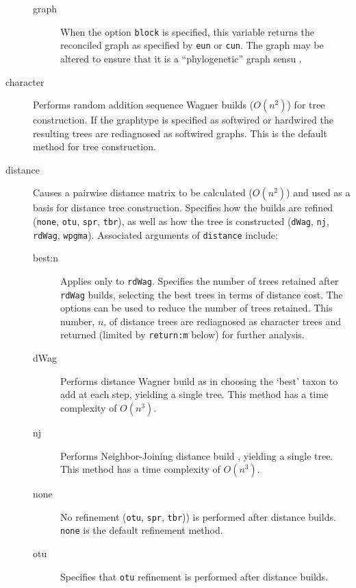 \begin{description}
\begin{description}
			\item[graph] When the option \texttt{block} is specified, this variable returns the 
			reconciled graph as specified by \texttt{eun} or \texttt{cun}. The graph may be 
			altered to ensure that it is a ``phylogenetic'' graph sensu \cite{Moretetal2005}.
		\end{description}			
		
		\item [character] Performs random addition sequence Wagner \citep{Farris1970} builds 
		($O(n^2)$) for tree construction. If the graphtype is specified as softwired or hardwired 
		the resulting trees are rediagnosed as softwired graphs. This is 
		the default method for tree construction.
		
		\item [distance] Causes a pairwise distance matrix to be calculated ($O(n^2)$) and used 
		as a basis for distance tree construction. Specifies how the builds are refined (\texttt{none}, 
		\texttt{otu}, \texttt{spr}, \texttt{tbr}), as well as how the tree is constructed (\texttt{dWag}, 
		\texttt{nj}, \texttt{rdWag}, \texttt{wpgma}). Associated arguments of \texttt{distance} include:
				
		\begin{description}
			\item[best:n] Applies only to \texttt{rdWag}. Specifies the number of trees retained 
			after 	\texttt{rdWag} builds, selecting the best trees in terms of distance cost. The 
			options can be used to reduce the number of trees retained.  
			This number, $n$, of distance trees are rediagnosed as character trees
			and returned (limited by \texttt{return:m} below) for further analysis.
			
			\item[dWag] Performs distance Wagner build as in \citep{Farris1972} choosing the 
			`best' taxon to 
			add at each step, yielding a single tree. This method has a time complexity of $O(n^3)$.

			\item[nj] Performs Neighbor-Joining distance build \citep{Saitou1987}, yielding a single 
			tree. This method has a time complexity of $O(n^3)$.

			\item[none] No refinement (\texttt{otu}, \texttt{spr}, \texttt{tbr})) is performed after 
			distance builds. \texttt{none} is the default refinement method.
						
			\item[otu] Specifies that \texttt{otu} refinement \citep{Wheeler2021} is performed 
			after distance 
			builds.
			

\end{description}
\end{description}
